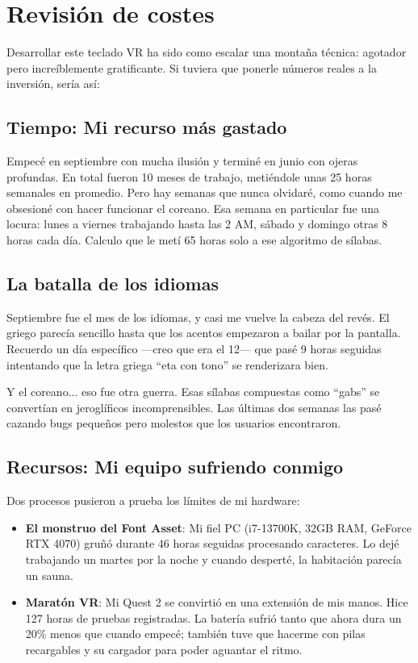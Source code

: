 
\section{Revisión de costes}

Desarrollar este teclado VR ha sido como escalar una montaña técnica: agotador pero increíblemente gratificante. Si tuviera que ponerle números reales a la inversión, sería así:

\subsection{Tiempo: Mi recurso más gastado}
Empecé en septiembre con mucha ilusión y terminé en junio con ojeras profundas. En total fueron 10 meses de trabajo, metiéndole unas 25 horas semanales en promedio. Pero hay semanas que nunca olvidaré, como cuando me obsesioné con hacer funcionar el coreano. Esa semana en particular fue una locura: lunes a viernes trabajando hasta las 2 AM, sábado y domingo otras 8 horas cada día. Calculo que le metí 65 horas solo a ese algoritmo de sílabas. 

\subsection{La batalla de los idiomas}
Septiembre fue el mes de los idiomas, y casi me vuelve la cabeza del revés. El griego parecía sencillo hasta que los acentos empezaron a bailar por la pantalla. Recuerdo un día específico —creo que era el 12— que pasé 9 horas seguidas intentando que la letra griega ``eta con tono'' se renderizara bien. 

Y el coreano... eso fue otra guerra. Esas sílabas compuestas como ``gabs'' se convertían en jeroglíficos incomprensibles. Las últimas dos semanas las pasé cazando bugs pequeños pero molestos que los usuarios encontraron.

\subsection{Recursos: Mi equipo sufriendo conmigo}
Dos procesos pusieron a prueba los límites de mi hardware:
\begin{itemize}
	\item \textbf{El monstruo del Font Asset}: Mi fiel PC (i7-13700K, 32GB RAM, GeForce RTX 4070) gruñó durante 46 horas seguidas procesando caracteres. Lo dejé trabajando un martes por la noche y cuando desperté, la habitación parecía un sauna.
	\item \textbf{Maratón VR}: Mi Quest 2 se convirtió en una extensión de mis manos. Hice 127 horas de pruebas registradas. La batería sufrió tanto que ahora dura un 20\% menos que cuando empecé; también tuve que hacerme con pilas recargables y su cargador para poder aguantar el ritmo. 
\end{itemize}


